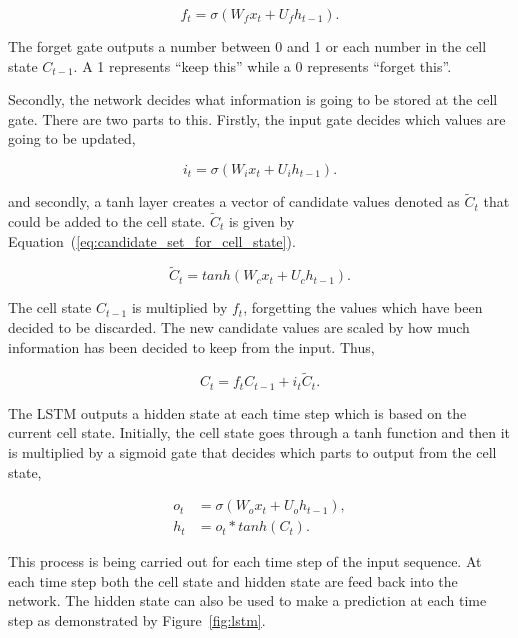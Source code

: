\begin{equation}\label{eq:forget_gate}
    f_{t} = \sigma(W_{f}x_{t} + U_{f}h_{t-1}).
\end{equation}

The forget gate outputs a number between 0 and 1 or each number in the cell
state \(C_{t-1}\). A 1 represents ``keep this'' while a 0 represents ``forget
this''.

Secondly, the network decides what information is going to be stored at the
cell gate. There are two parts to this. Firstly, the input gate decides which values
are going to be updated,

\begin{equation}\label{eq:input_gate}
    i_{t} = \sigma(W_{i}x_{t} + U_{i}h_{t-1}).
\end{equation}

and secondly, a tanh layer creates a vector of candidate values denoted as
\(\tilde{C}_{t}\) that could be added to the cell state. \(\tilde{C}_{t}\) 
is given by Equation~(\ref{eq:candidate_set_for_cell_state}).

\begin{equation}\label{eq:candidate_set_for_cell_state}
    \tilde{C}_{t} = tanh(W_{c}x_{t} + U_{c}h_{t-1}).
\end{equation}

The cell state \(C_{t-1}\) is multiplied by \(f_{t}\), forgetting the values
which have been decided to be discarded. The new candidate values are scaled by how
much information has been decided to keep from the input. Thus,

\begin{equation}\label{eq:cell_gate}
    C_{t} = f_{t} C_{t-1} + i_{t} \tilde{C}_{t}.
\end{equation}

The LSTM outputs a hidden state at each time step which is based on the current
cell state. Initially, the cell state goes through a tanh function and then it
is multiplied by a sigmoid gate that decides which parts to output from the cell
state,

\begin{align}\label{eq:outpu_gate}
    o_{t} & = \sigma(W_{o}x_{t} + U_{o}h_{t-1}), \\
    h_{t} & = o_{t} * tanh(C_{t}).
\end{align}

This process is being carried out for each time step of the input sequence. At
each time step both the cell state and hidden state are feed back into the
network. The hidden state can also be used to make a prediction at each time
step as demonstrated by Figure~\ref{fig:lstm}.

